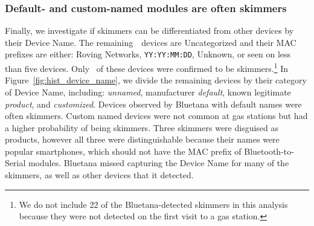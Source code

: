 \subsubsection*{Default- and custom-named modules are often skimmers} %

Finally, we investigate if skimmers can be differentiated from other devices by
their Device Name.
%
The remaining~\numberBTMACCoDfiltered~devices are Uncategorized and their MAC prefixes are either: Roving Networks, \texttt{YY:YY:MM:DD}, Unknown, or seen on less than five devices.
%
Only
\totalskimmersfirstvisit~of these devices were confirmed to be
skimmers.\footnote{We do not include 22 of the Bluetana-detected skimmers in
this analysis because they were not detected on the first visit to a gas
station.}
%
In Figure~\ref{fig:hist_device_name}, we divide the remaining devices by their
category of Device Name, including: \emph{unnamed}, manufacturer
\emph{default}, known legitimate \emph{product}, and \emph{customized}.
%
Devices observed by Bluetana with default names were often skimmers.
%
Custom named devices were not common at gas stations but had a higher
probability of being skimmers.
%
Three skimmers were disguised as products, however all three were
distinguishable because their names were popular smartphones, which should not
have the MAC prefix of Bluetooth-to-Serial modules.
%
Bluetana missed capturing the Device Name for many of the skimmers, as well as other
devices that it detected.
%
 
%





%

%




